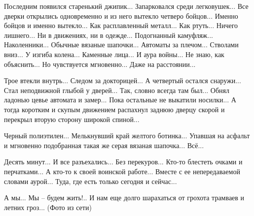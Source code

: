 
Последним появился старенький джипик... Запарковался среди легковушек... Все
дверки открылись одновременно и из него вытекло четверо бойцов... Именно бойцов
и именно вытекло... Как расплавленный металл... Как ртуть... Ничего лишнего...
Ни в движениях, ни в одежде... Подогнанный камуфляж... Наколенники...  Обычные
вязаные шапочки... Автоматы за плечом... Стволами вниз... У изгиба колена...
Каменные лица... И аура войны... Не знаю, как объяснить... Но чувствуется
мгновенно... Даже на расстоянии...

Трое втекли внутрь... Следом за докторицей... А четвертый остался снаружи...
Стал неподвижной глыбой у дверей... Так, словно всегда там был... Обнял ладонью
цевье автомата и замер... Пока остальные не выкатили носилки... А тогда
коротким и скупым движением распахнул заднюю дверцу скорой и перекрыл вторую
сторону широкой спиной...

Черный полиэтилен... Мелькнувший край желтого ботинка... Упавшая на асфальт и
мгновенно подобранная такая же серая вязаная шапочка... Всё...

Десять минут... И все разъехались... Без перекуров... Кто-то блестеть очками и
перчатками... А кто-то к своей воинской работе... Вместе с ее непередаваемой
словами аурой... Туда, где есть только сегодня и сейчас...

А мы... Мы – будем жить!.. И нам еще долго шарахаться от грохота трамваев и
летних гроз... (Фото из сети)

